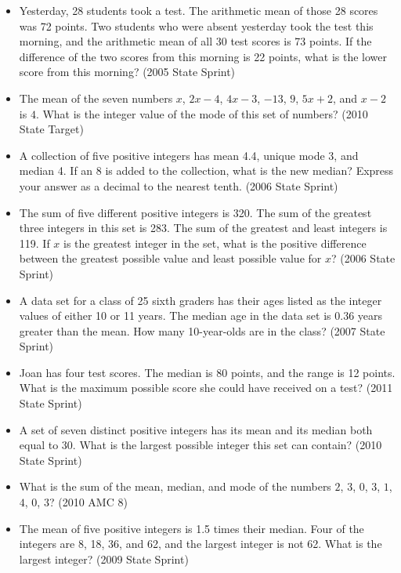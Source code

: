 \documentclass{article}
\begin{document}
\begin{itemize}
\item Yesterday, 28 students took a test. The arithmetic mean of those 28 scores was 72 points. Two students who were absent yesterday took the test this morning, and the arithmetic mean of all 30 test scores is 73 points. If the difference of the two scores from this morning is 22 points, what is the lower score from this morning? (2005 State Sprint)

\item The mean of the seven numbers $x$, $2x-4$, $4x-3$, $-13$, $9$, $5x+2$, and $x-2$ is $4$. What is the integer value of the mode of this set of numbers? (2010 State Target)

\item A collection of five positive integers has mean 4.4, unique mode 3, and median 4. If an 8 is added to the collection, what is the new median? Express your answer as a decimal to the nearest tenth. (2006 State Sprint)

\item The sum of five different positive integers is 320. The sum of the greatest three integers in this set is 283. The sum of the greatest and least integers is 119. If $x$ is the greatest integer in the set, what is the positive difference between the greatest possible value and least possible value for $x$? (2006 State Sprint)

\item A data set for a class of 25 sixth graders has their ages listed as the integer values of either 10 or 11 years. The median age in the data set is 0.36 years greater than the mean. How many 10-year-olds are in the class? (2007 State Sprint)

\item  Joan has four test scores. The median is 80 points, and the range is 12 points. What is the maximum possible score she could have received on a test? (2011 State Sprint)

\item A set of seven distinct positive integers has its mean and its median both equal to 30. What is the largest possible integer this set can contain? (2010 State Sprint)

\item What is the sum of the mean, median, and mode of the numbers $2$, $3$, $0$, $3$, $1$, $4$, $0$, $3$? (2010 AMC 8)

\item The mean of five positive integers is 1.5 times their median. Four of the integers are 8, 18, 36, and 62, and the largest integer is not 62. What is the largest integer? (2009 State Sprint)


\end{itemize}
\end{document}
